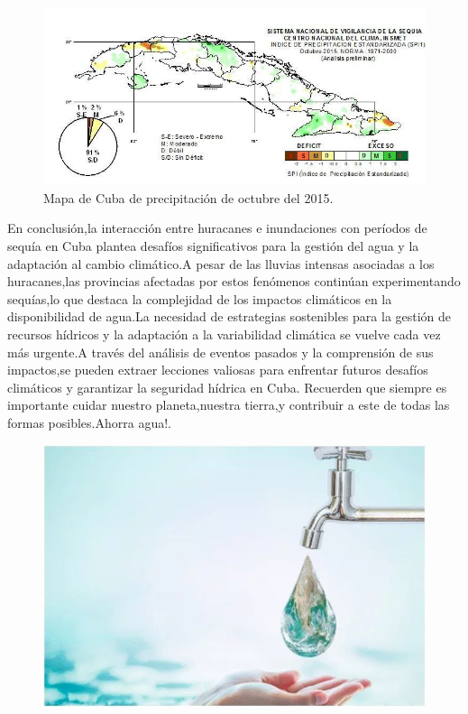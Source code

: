 \documentclass[12pt]{article}
\begin{document}
\begin{figure}[H]
	\centering
	\includegraphics[width=0.7\linewidth]{./Report/images/mapa_octubre_2015}
	\caption{Mapa de Cuba de precipitación de octubre del 2015.}
	\label{fig:mapaoctubre2015}
\end{figure}



En conclusión,la interacción entre huracanes e inundaciones con períodos de sequía en Cuba plantea desafíos significativos para la gestión del agua y la adaptación al cambio climático.A pesar de las lluvias intensas asociadas a los huracanes,las provincias afectadas por estos fenómenos continúan experimentando sequías,lo que destaca la complejidad de los impactos climáticos en la disponibilidad de agua.La necesidad de estrategias sostenibles para la gestión de recursos hídricos y la adaptación a la variabilidad climática se vuelve cada vez más urgente.A través del análisis de eventos pasados y la comprensión de sus impactos,se pueden extraer lecciones valiosas para enfrentar futuros desafíos climáticos y garantizar la seguridad hídrica en Cuba. Recuerden que siempre es importante cuidar nuestro planeta,nuestra tierra,y contribuir a este de todas las formas posibles.Ahorra agua!.


\begin{figure}[H]
	\centering
	\includegraphics[width=0.4\linewidth]{./Report/images/agua}
	\label{fig:agua}
\end{figure}
\end{document}
